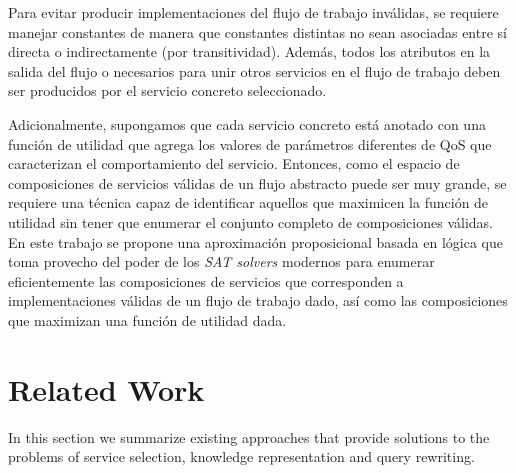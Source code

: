 \documentclass{llncs}
\begin{document}
Para evitar producir implementaciones del flujo de trabajo inválidas, se
requiere manejar constantes de manera que constantes distintas no sean asociadas
entre sí directa o indirectamente (por transitividad). Además, todos los
atributos en la salida del flujo o necesarios para unir otros servicios en el
flujo de trabajo deben ser producidos por el servicio concreto seleccionado.

Adicionalmente, supongamos que cada servicio concreto está anotado con una
función de utilidad que agrega los valores de parámetros diferentes de QoS que
caracterizan el comportamiento del servicio. Entonces, como el espacio de
composiciones de servicios válidas de un flujo abstracto puede ser muy grande,
se requiere una técnica capaz de identificar aquellos que maximicen la función
de utilidad sin tener que enumerar el conjunto completo de composiciones
válidas. En este trabajo se propone una aproximación proposicional basada en
lógica que toma provecho del poder de los \emph{SAT solvers} modernos para
enumerar eficientemente las composiciones de servicios que corresponden a
implementaciones válidas de un flujo de trabajo dado, así como las composiciones
que maximizan una función de utilidad dada.

\section{Related Work}
In this section we summarize existing approaches that provide solutions to the problems of service selection, knowledge representation and query rewriting. 
\end{document}
